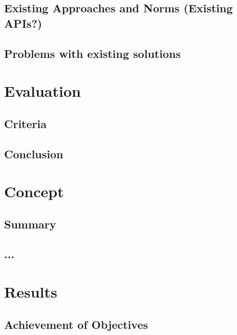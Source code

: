 \documentclass[a4paper,parskip=full]{scrreprt}
\begin{document}
\section{Existing Approaches and Norms (Existing APIs?)}
\section{Problems with existing solutions}  

\chapter{Evaluation}
\section{Criteria}
\section{Conclusion}

\chapter{Concept}
\section{Summary}
\section{...}

\chapter{Results}
\section{Achievement of Objectives}
\end{document}
